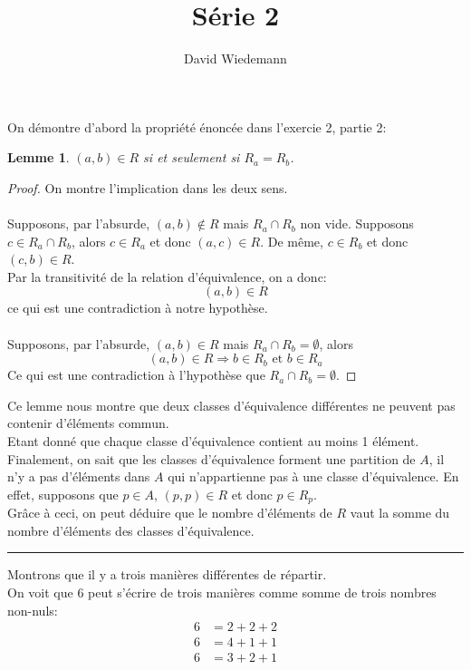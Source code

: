 \documentclass[11pt, a4paper]{article}
\newtheorem{lemma}{Lemme}
\newcommand\hr{
    \noindent\rule[0.5ex]{\linewidth}{0.5pt}\newline
}
\begin{document}
\title{Série 2}
\author{David Wiedemann}
\maketitle
On démontre d'abord la propriété énoncée dans l'exercie 2, partie 2:
\begin{lemma}
	$(a,b) \in R$ si et seulement si $R_a = R_b$.
\end{lemma}
\begin{proof}
On montre l'implication dans les deux sens.\\
\framebox[1.1\width]{$  \Longrightarrow $}\\
Supposons, par l'absurde, $(a,b) \notin R$ mais $R_a \cap R_b$ non vide.
Supposons $ c \in R_a \cap R_b$, alors $c \in R_a$ et donc $(a,c) \in R$.
De même, $c \in R_b$ et donc $(c,b) \in R$.\\
Par la transitivité de la relation d'équivalence, on a donc:
\[ 
	(a,b) \in R
\]
ce qui est une contradiction à notre hypothèse.\\
\framebox[1.1\width]{$  \Longleftarrow $}\\
Supposons, par l'absurde, $(a,b) \in R$ mais $R_a \cap R_b = \emptyset$, alors
\[ 
	( a,b) \in R \Rightarrow b \in R_b \text{ et }  b \in R_a
\]
Ce qui est une contradiction à l'hypothèse que $R_a \cap R_b = \emptyset$.
\end{proof}

Ce lemme nous montre que deux classes d'équivalence différentes ne peuvent pas contenir d'éléments commun.\\
Etant donné que chaque classe d'équivalence contient au moins 1 élément.
Finalement, on sait que les classes d'équivalence forment une partition de $A$, il n'y a pas d'éléments dans $A$ qui n'appartienne pas à une classe d'équivalence. En effet, supposons que $p \in A$, $(p,p) \in R$ et donc $p \in R_p$.\\
Grâce à ceci, on peut déduire que le nombre d'éléments de $R$ vaut la somme du nombre d'éléments des classes d'équivalence.\\
\hr
Montrons que il y a trois manières différentes de répartir.\\
On voit que 6 peut s'écrire de trois manières comme somme de trois nombres non-nuls:
\begin{align*}
	6&= 2+2+2\\
	6&= 4+1+1\\
	6&= 3+2+1
\end{align*}
\end{document}
